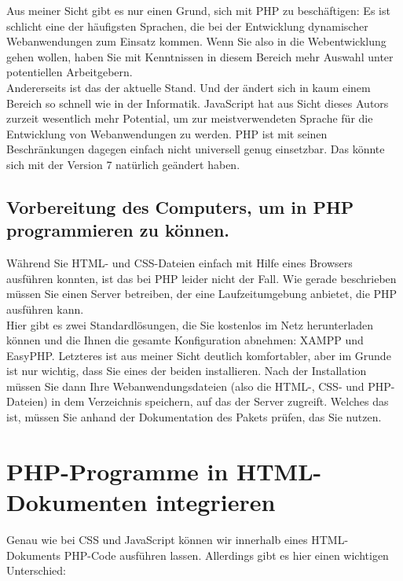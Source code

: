 Aus meiner Sicht gibt es nur einen Grund, sich mit PHP zu beschäftigen: Es ist schlicht eine der häufigsten Sprachen, die bei der Entwicklung dynamischer Webanwendungen zum Einsatz kommen. Wenn Sie also in die Webentwicklung gehen wollen, haben Sie mit Kenntnissen in diesem Bereich mehr Auswahl unter potentiellen Arbeitgebern.\\

Andererseits ist das der aktuelle Stand. Und der ändert sich in kaum einem Bereich so schnell wie in der Informatik. JavaScript hat aus Sicht dieses Autors zurzeit wesentlich mehr Potential, um zur meistverwendeten Sprache für die Entwicklung von Webanwendungen zu werden. PHP ist mit seinen Beschränkungen dagegen einfach nicht universell genug einsetzbar. Das könnte sich mit der Version 7 natürlich geändert haben.

\subsection{Vorbereitung des Computers, um in PHP programmieren zu können.}

Während Sie HTML- und CSS-Dateien einfach mit Hilfe eines Browsers ausführen konnten, ist das bei PHP leider nicht der Fall. Wie gerade beschrieben müssen Sie einen Server betreiben, der eine Laufzeitumgebung anbietet, die PHP ausführen kann.\\


Hier gibt es zwei Standardlösungen, die Sie kostenlos im Netz herunterladen können und die Ihnen die gesamte Konfiguration abnehmen: XAMPP und EasyPHP. Letzteres ist aus meiner Sicht deutlich komfortabler, aber im Grunde ist nur wichtig, dass Sie eines der beiden installieren. Nach der Installation müssen Sie dann Ihre Webanwendungsdateien (also die HTML-, CSS- und PHP-Dateien) in dem Verzeichnis speichern, auf das der Server zugreift. Welches das ist, müssen Sie anhand der Dokumentation des Pakets prüfen, das Sie nutzen.

\section{PHP-Programme in HTML-Dokumenten integrieren}

Genau wie bei CSS und JavaScript können wir innerhalb eines HTML-Dokuments PHP-Code ausführen lassen. Allerdings gibt es hier einen wichtigen Unterschied:

